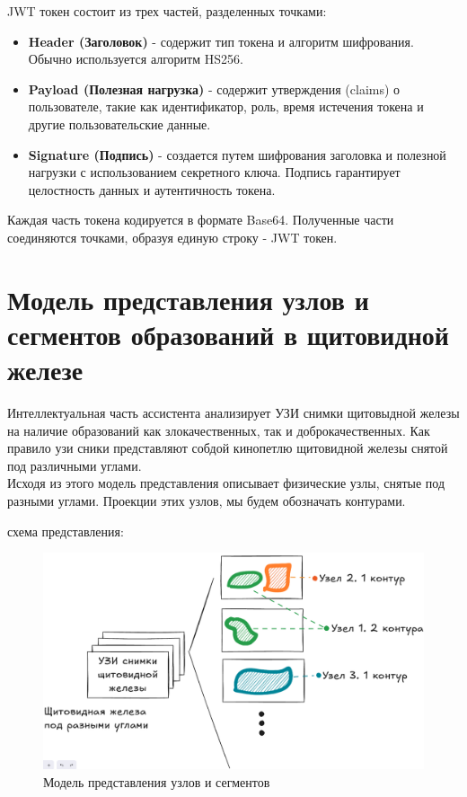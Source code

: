JWT токен состоит из трех частей, разделенных точками:

\begin{itemize}
    \item \textbf{Header (Заголовок)} - содержит тип токена и алгоритм шифрования. Обычно используется алгоритм HS256.
    \item \textbf{Payload (Полезная нагрузка)} - содержит утверждения (claims) о пользователе, такие как идентификатор, роль, время истечения токена и другие пользовательские данные.
    \item \textbf{Signature (Подпись)} - создается путем шифрования заголовка и полезной нагрузки с использованием секретного ключа. Подпись гарантирует целостность данных и аутентичность токена.
\end{itemize}

Каждая часть токена кодируется в формате Base64. Полученные части соединяются точками, образуя единую строку - JWT токен.


\section{Модель представления узлов и сегментов образований в щитовидной железе}

Интеллектуальная часть ассистента анализирует УЗИ снимки щитовыдной железы на наличие образований как злокачественных, так и доброкачественных. Как правило узи сники представляют собдой кинопетлю щитовидной железы снятой под различными углами. \\
Исходя из этого модель представления описывает физические узлы, снятые под разными углами. Проекции этих узлов, мы будем обозначать контурами.

схема представления:
\begin{figure}[H]%
	\begin{center}
		\includegraphics[width=.6\columnwidth]{./img/new/nodes_segments_model.png}%
	\end{center}
	\caption{Модель представления узлов и сегментов}%
	\label{pic:nodes_segments_model}%
\end{figure}

